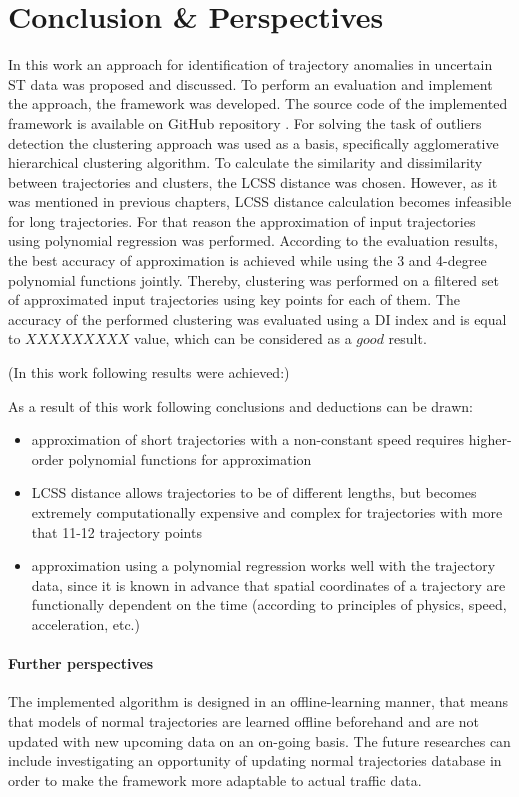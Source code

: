 \chapter{Conclusion \& Perspectives}
\label{ch:Conclusion & Perspectives}

In this work an approach for identification of trajectory anomalies in uncertain ST data was proposed and discussed. To perform an evaluation and implement the approach, the framework was developed. The source code of the implemented framework is available on GitHub repository \cite{online:mt_anomalies}. For solving the task of outliers detection the clustering approach was used as a basis, specifically agglomerative hierarchical clustering algorithm. To calculate the similarity and dissimilarity between trajectories and clusters, the LCSS distance was chosen. However, as it was mentioned in previous chapters, LCSS distance calculation becomes infeasible for long trajectories. For that reason the approximation of input trajectories using polynomial regression was performed. According to the evaluation results, the best accuracy of approximation is achieved while using the 3 and 4-degree polynomial functions jointly. Thereby, clustering was performed on a filtered set of approximated input trajectories using key points for each of them. The accuracy of the performed clustering was evaluated using a DI index and is equal to $XXXXXXXXX$ value, which can be considered as a $good$ result.

(In this work following results were achieved:)

As a result of this work following conclusions and deductions can be drawn:
\begin{itemize}
	\item approximation of short trajectories with a non-constant speed requires higher-order polynomial functions for approximation
	\item LCSS distance allows trajectories to be of different lengths, but becomes extremely computationally expensive and complex for trajectories with more that 11-12 trajectory points
	\item approximation using a polynomial regression works well with the trajectory data, since it is known in advance that spatial coordinates of a trajectory are functionally dependent on the time (according to principles of physics, speed, acceleration, etc.)
	
\end{itemize}


\bigbreak

\subsubsection{Further perspectives}
The implemented algorithm is designed in an offline-learning manner, that means that models of normal trajectories are learned offline beforehand and are not updated with new upcoming data on an on-going basis. The future researches can include investigating an opportunity of updating normal trajectories database in order to make the framework more adaptable to actual traffic data.
